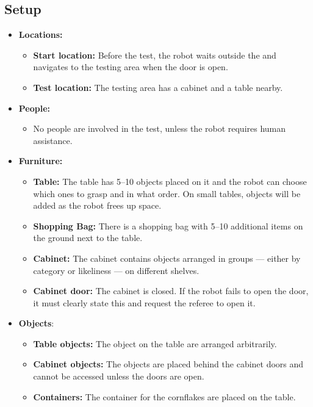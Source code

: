 \subsection*{Setup}
\begin{itemize}
	\item \textbf{Locations:}
		\begin{itemize}
			\item \textbf{Start location:} Before the test, the robot waits outside the \Arena{} and navigates to the testing area when the door is open.
			\item \textbf{Test location:} The testing area has a cabinet and a table nearby.
		\end{itemize}
	\item \textbf{People:}
		\begin{itemize}
			\item No people are involved in the test, unless the robot requires human assistance.
		\end{itemize}
	\item \textbf{Furniture:}
		\begin{itemize}
			\item \textbf{Table:} The table has 5--10 objects placed on it and the robot can choose which ones to grasp and in what order. On small tables, objects will be added as the robot frees up space.
			\item \textbf{Shopping Bag:} There is a shopping bag with 5--10 additional items on the ground next to the table.
			\item \textbf{Cabinet:} The cabinet contains objects arranged in groups --- either by category or likeliness --- on different shelves.
			\item \textbf{Cabinet door:} The cabinet is closed. If the robot fails to open the door, it must clearly state this and request the referee to open it.
		\end{itemize}
	\item \textbf{Objects}:
		\begin{itemize}
			\item \textbf{Table objects:} The object on the table are arranged arbitrarily.
			\item \textbf{Cabinet objects:} The objects are placed behind the cabinet doors and cannot be accessed unless the doors are open.
			\item \textbf{Containers:} The container for the cornflakes are placed on the table.
		\end{itemize}
\end{itemize}



